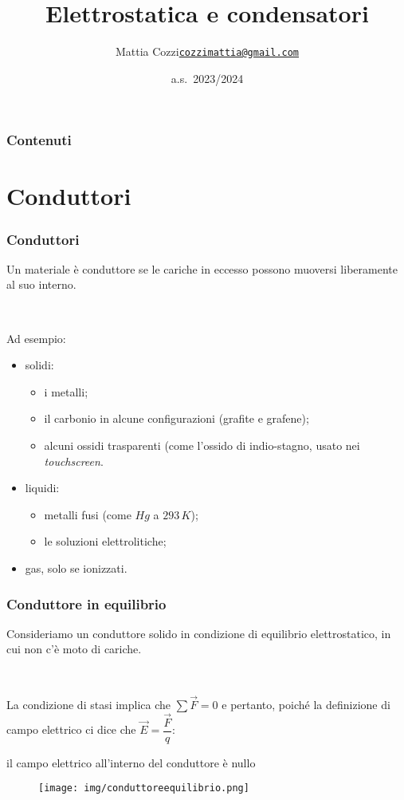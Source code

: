 \documentclass[]{beamer}
\title{Elettrostatica e condensatori}
\author{\texorpdfstring{Mattia Cozzi\newline\href{mailto:cozzimattia@gmail.com}{\texttt{cozzimattia@gmail.com}}}{Mattia Cozzi}}
\date{a.s.~2023/2024}
\theoremstyle{plain}
\begin{document}
\begin{frame}
  \titlepage
\end{frame}




\begin{frame}
\frametitle{Contenuti}
\tableofcontents
\end{frame}

\section{Conduttori}




\begin{frame}
\frametitle{Conduttori}
Un materiale è conduttore se le cariche in eccesso possono \alert<1>{muoversi liberamente} al suo interno.{\pause}

~

Ad esempio:
\begin{itemize}
  \item solidi:
  \begin{itemize}
    \item i metalli;
    \item il carbonio in alcune configurazioni (grafite e grafene);
    \item alcuni ossidi trasparenti (come l'ossido di indio-stagno, usato nei \emph{touchscreen}.
  \end{itemize}\pause
  \item liquidi:
  \begin{itemize}
    \item metalli fusi (come $ Hg $ a $ 293 \, K $);
    \item le soluzioni elettrolitiche;
  \end{itemize}\pause
  \item gas, solo se ionizzati.
\end{itemize}
\end{frame}

\begin{frame}
\frametitle{Conduttore in equilibrio}
Consideriamo un conduttore solido in condizione di \alert{equilibrio elettrostatico}, in cui non c'è moto di cariche.\pause

~

La condizione di stasi implica che $ \sum \vec{F} = 0 $ e pertanto, poiché la definizione di campo elettrico ci dice che $ \vec{E} = \dfrac{\vec{F}}{q} $:
\begin{center}
\colorbox{marroncino!30}{il campo elettrico all'interno del conduttore è nullo}
\end{center}
\begin{figure}
\texttt{[image: img/conduttoreequilibrio.png]}
\end{figure}
\end{frame}
\end{document}
